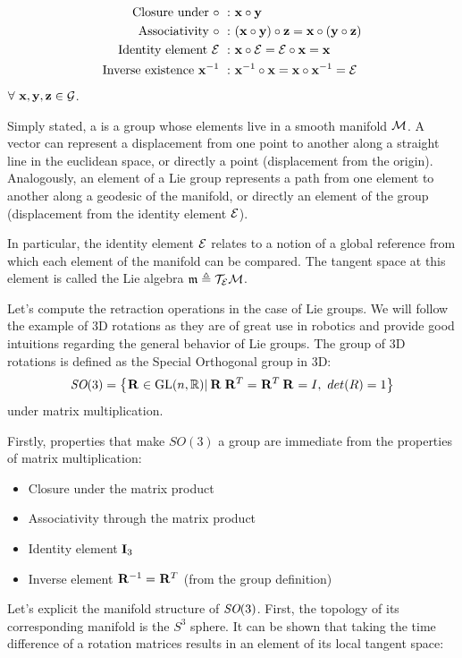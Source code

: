 \begin{align}
    \text{Closure under}~\circ~:&~{\bf x} \circ {\bf y} \\ 
    \text{Associativity}~\circ~:&~({\bf x} \circ {\bf y}) \circ {\bf z} = {\bf x} \circ ({\bf y} \circ {\bf z}) \\ 
    \text{Identity element}~\mathcal{E}~:&~{\bf x} \circ \mathcal{E} = \mathcal{E} \circ {\bf x} = {\bf x} \\ 
    \text{Inverse existence}~{\bf x}^{-1}~:&~{\bf x}^{-1} \circ {\bf x} = {\bf x} \circ {\bf x}^{-1} = \mathcal{E}
\end{align}
$\forall~{\bf x},{\bf y},{\bf z} \in \mathcal{G}$.

Simply stated, a  is a group whose elements live in a smooth manifold $\mathcal{M}$.
A vector can represent a displacement from one point to another along a straight line in the euclidean space, or directly a point (displacement from the origin).
Analogously, an element of a Lie group represents a path from one element to another along a geodesic of the manifold, or directly an element of the group 
(displacement from the identity element $\mathcal{E}$).

In particular, the identity element $\mathcal{E}$ relates to a notion of a global reference from which each element of the manifold can be compared.
The tangent space at this element is called the Lie algebra $\mathfrak{m} \triangleq \mathcal{T}_{\mathcal{E}}\mathcal{M}$.

Let's compute the retraction operations in the case of Lie groups. We will follow the example of 3D rotations as they are of great use in robotics and provide
good intuitions regarding the general behavior of Lie groups.
The group of 3D rotations is defined as the Special Orthogonal group in 3D: 
\begin{equation}
    \textit{SO}(3) = \left\{\prescript{}{}{{\bf R}}_{} \in \text{GL}(n,\mathbb{R}) | \prescript{}{}{{\bf R}}_{}\prescript{}{}{{\bf R}}_{}^T=\prescript{}{}{{\bf R}}_{}^T\prescript{}{}{{\bf R}}_{}=I,~det(R)=1\right\}
\end{equation}
under matrix multiplication.


Firstly, properties that make $SO(3)$ a group are immediate from the properties of matrix multiplication:
%
\begin{itemize}
    \item Closure under the matrix product
    \item Associativity through the matrix product
    \item Identity element ${\bf I}_3$
    \item Inverse element $\prescript{}{}{{\bf R}}_{}^{-1} = \prescript{}{}{{\bf R}}_{}^T$ (from the group definition)
\end{itemize}
%
Let's explicit the manifold structure of $\textit{SO}(3)$. First, the topology of its corresponding manifold is the $S^3$ sphere.
It can be shown \cite{sola2018micro} that taking the time difference of a rotation matrices results in an element of its local tangent space:

